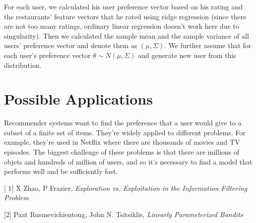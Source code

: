 \documentclass{article}
\theoremstyle{plain}
\theoremstyle{definition}
\renewenvironment{thebibliography}[1]{%
    \begin{oldthebibliography}{#1}%
      \setlength{\parskip}{.3ex}%
      \setlength{\itemsep}{.3ex}%
  }%
  {%
    \end{oldthebibliography}%
  }
\begin{document}
For each user, we calculated his user preference vector based on his rating and the restaurants' feature vectors that he rated using ridge regression (since there are not too many ratings, ordinary linear regression doesn't work here due to singularity). Then we calculated the sample mean and the sample variance of all users' preference vector and denote them as $(\mu,\Sigma)$. We further assume that for each user's preference vector $\theta\sim N(\mu,\Sigma)$ and generate new user from this distribution.



\section{Possible Applications}

Recommender systems want to find the preference that a user would give to a subset of a finite set of items. They're widely applied to different problems. For example, they're used in Netflix where there are thousands of movies and TV episodes. The biggest challenge of these problems is that there are millions of objets and hundreds of million of users, and so it's necessary to find a model that performs well and be sufficiently fast.




\begin{thebibliography}
[1] X Zhao, P Frazier, \emph{Exploration vs. Exploitation in the Information Filtering Problem}

[2] Paat Rusmevichientong, John N. Tsitsiklis, \emph{Linearly Parameterized Bandits}
\end{thebibliography}
\end{document}
